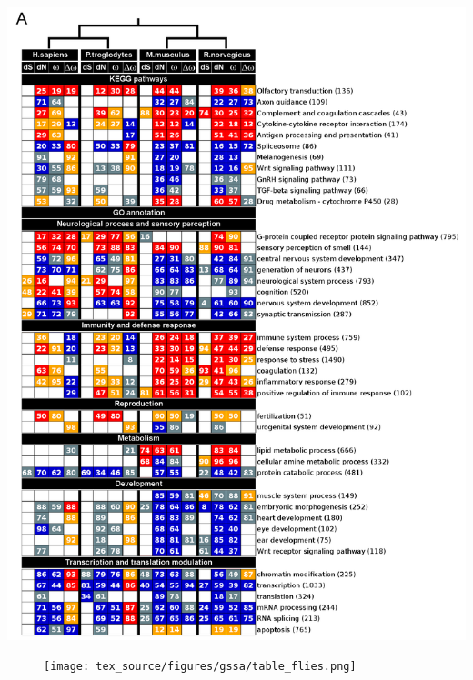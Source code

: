 \begin{FPfigure}
\centering 
\includegraphics[width=\textwidth]{tex_source/figures/gssa/table_mammals.png}
\caption[GSSA of evolutionary variables.]{{\bf GSSA of evolutionary variables.} \\The figure shows a selection of GO terms and KEGG pathways with significant and not significant deviations after GSSA of evolutionary rates in mammals (A) and Drosophila (B) species. Colored boxes represent functional modules with genes significantly accumulated at the corresponding extremes of the ranked list as explained in Figure 2. The number inside each box represents the percentage of the total number of genes of the functional module (in parenthesis) that contribute to its significance. Here we reported the numbers of the first significant partition after FET and FDR. Topologies represent the phylogenetic relationships of species.} 
\label{fig:tab_gssa}
\end{FPfigure}
\begin{figure}
\centering 
\texttt{[image: tex\_source/figures/gssa/table\_flies.png]}
\end{figure}

